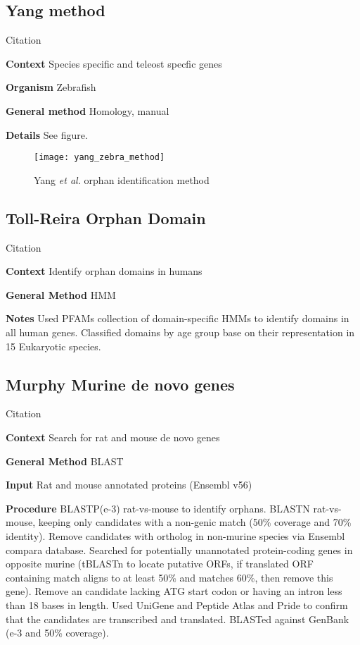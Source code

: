 \subsection{Yang method}

Citation \cite{yang_genome-wide_2013}

\textbf{Context} Species specific and teleost specfic genes

\textbf{Organism} Zebrafish

\textbf{General method} Homology, manual

\textbf{Details} See figure.

\begin{figure}[h!]
    \centering
    \texttt{[image: yang\_zebra\_method]}
    \caption{Yang \textit{et al.} orphan identification method}
\end{figure}
\FloatBarrier


\subsection{Toll-Reira Orphan Domain}

Citation \cite{toll-riera_emergence_2013}

\textbf{Context} Identify orphan domains in humans

\textbf{General Method} HMM

\textbf{Notes} Used PFAMs collection of domain-specific HMMs to identify
domains in all human genes. Classified domains by age group base on their
representation in 15 Eukaryotic species.
\subsection{Murphy Murine de novo genes}

Citation \cite{murphy_novo_2012}

\textbf{Context} Search for rat and mouse de novo genes

\textbf{General Method} BLAST

\textbf{Input} Rat and mouse annotated proteins (Ensembl v56)

\textbf{Procedure} BLASTP(e-3) rat-vs-mouse to identify orphans. BLASTN
rat-vs-mouse, keeping only candidates with a non-genic match (50\% coverage
and 70\% identity). Remove candidates with ortholog in non-murine species
via Ensembl compara database. Searched for potentially unannotated
protein-coding genes in opposite murine (tBLASTn to locate putative ORFs,
if translated ORF containing match aligns to at least 50\% and matches
60\%, then remove this gene). Remove an candidate lacking ATG start codon
or having an intron less than 18 bases in length. Used UniGene and Peptide
Atlas and Pride to confirm that the candidates are transcribed and
translated. BLASTed against GenBank (e-3 and 50\% coverage).

